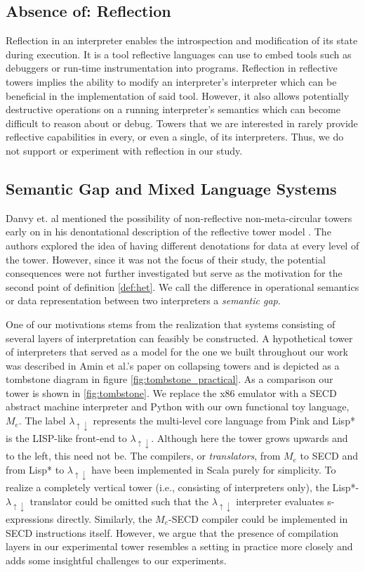 \documentclass[a4paper,12pt,twoside,openright]{report}
\theoremstyle{definition}
\newcommand{\mslang}{$\lambda_{\uparrow\downarrow}$}
\newcommand{\mevl}{$M_{e}$}
\begin{document}
\subsection{Absence of: Reflection}
Reflection in an interpreter enables the introspection and modification of its state during execution. It is a tool reflective languages can use to embed tools such as debuggers or run-time instrumentation into programs. Reflection in reflective towers implies the ability to modify an interpreter's interpreter which can be beneficial in the implementation of said tool. However, it also allows potentially destructive operations on a running interpreter's semantics which can become difficult to reason about or debug. Towers that we are interested in rarely provide reflective capabilities in every, or even a single, of its interpreters. Thus, we do not support or experiment with reflection in our study.

\subsection{Semantic Gap and Mixed Language Systems}
Danvy et. al mentioned the possibility of non-reflective non-meta-circular towers early on in his denontational description of the reflective tower model \cite{danvy1988intensions}. The authors explored the idea of having different denotations for data at every level of the tower. However, since it was not the focus of their study, the potential consequences were not further investigated but serve as the motivation for the second point of definition \ref{def:het}. We call the difference in operational semantics or data representation between two interpreters a \textit{semantic gap}.

One of our motivations stems from the realization that systems consisting of several layers of interpretation can feasibly be constructed. A hypothetical tower of interpreters that served as a model for the one we built throughout our work was described in Amin et al.'s paper on collapsing towers \cite{amin2017collapsing} and is depicted as a tombstone diagram in figure \ref{fig:tombstone_practical}. As a comparison our tower is shown in \ref{fig:tombstone}. We replace the x86 emulator with a SECD abstract machine interpreter and Python with our own functional toy language, \mevl. The label \mslang{} represents the multi-level core language from Pink \cite{amin2017collapsing} and Lisp* is the LISP-like front-end to \mslang. Although here the tower grows upwards and to the left, this need not be. The compilers, or \textit{translators}, from \mevl{} to SECD and from Lisp* to \mslang{} have been implemented in Scala purely for simplicity. To realize a completely vertical tower (i.e., consisting of interpreters only), the Lisp*-\mslang{} translator could be omitted such that the \mslang{} interpreter evaluates s-expressions directly. Similarly, the \mevl-SECD compiler could be implemented in SECD instructions itself. However, we argue that the presence of compilation layers in our experimental tower resembles a setting in practice more closely and adds some insightful challenges to our experiments.
\end{document}
